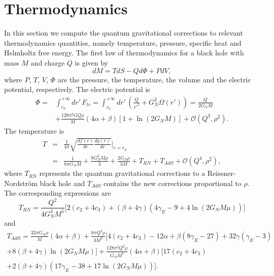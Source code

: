 \documentclass[10pt,a4paper]{article}
\begin{document}
\section{Thermodynamics}\label{sec:thermodynamics}
In this section we compute the quantum gravitational corrections to relevant thermodynamics quantities, namely temperature, pressure, specific heat and Helmholtz free energy. The first law of thermodynamics for a black hole with mass $M$ and charge $Q$ is given by
\begin{equation}
    dM=TdS-Qd\Phi+PdV,
\end{equation}
where $P$, $T$, $V$, $\Phi$ are the pressure, the temperature, the volume and the electric potential, respectively.
The electric potential is 
\begin{equation}
\begin{split}
\Phi=&\int_{r_h}^{+\infty} dr'\, F_{tr}=\int_{r_h}^{+\infty} dr'\, \left(\frac{Q}{{r'}^2}+G^2_N\Omega(r')\right)=\frac{Q}{2G_N M}\\
&+\frac{128\pi^2GQ\rho}{M}(4\alpha+\beta)\left[1+\ln(2G_NM)\right]+\mathcal{O}\left(Q^3,\rho^2\right).
\end{split}
\end{equation}
The temperature is
\begin{eqnarray}
    T&=&\frac{1}{4\pi}\sqrt{\frac{df(r)}{dr}\frac{dg(r)}{dr}}\bigg\rvert_{r=r_h}\nonumber\\
    &=&\frac{1}{8\pi G_N M}+\frac{8G_N^2M\rho}{3}+\frac{2G_N\rho}{3M}+T_{RN}+T_{AdS}+\mathcal{O}\left(Q^4,\rho^2\right),
\end{eqnarray}
where $T_{RN}$ represents the quantum gravitational corrections to a Reissner-Nordstr\"om black hole and $T_{AdS}$ contains the new corrections proportional to $\rho$. The corresponding expressions are
\begin{equation}
   T_{RN}=\frac{Q^2}{4G^3_NM^5}\Big[2(c_2+4c_3)+(\beta+4\gamma)\left(4\gamma_E-9+4\ln(2G_NM\mu)\right)\Big]
\end{equation}
and
\begin{equation}
\begin{gathered}
    T_{AdS}=\frac{32\pi G_N\rho}{M}(4\alpha+\beta)+\frac{8\pi Q^2\rho}{3M^3}\Big[4(c_2+4c_3)-12\alpha+\beta(8\gamma_E-27)+32\gamma(\gamma_E-3)\\
    +8(\beta+4\gamma)\ln(2G_NM\mu)\Big]+\frac{128\pi^2Q^2\rho}{G_NM^5}(4\alpha+\beta)\Big[17(c_2+4c_3)\\
    +2(\beta+4\gamma)\left(17\gamma_E-38+17\ln(2G_NM\mu)\right)\Big].
\end{gathered}
\end{equation}
\end{document}
